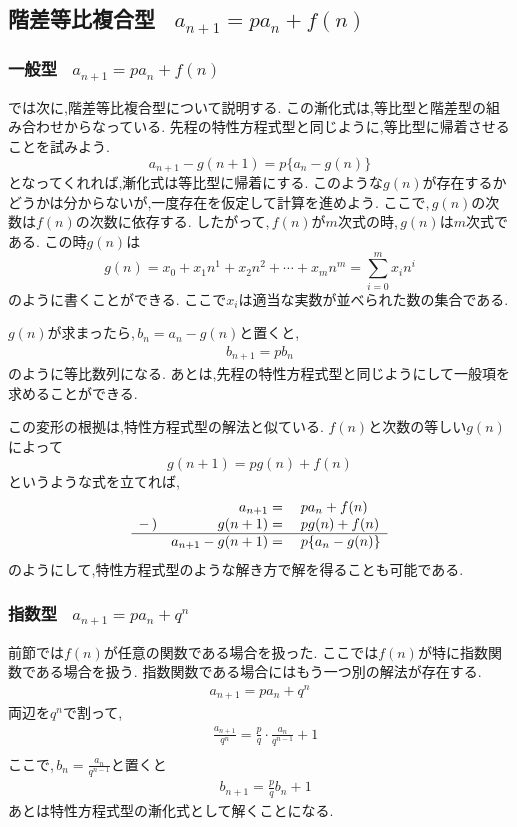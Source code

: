 
  \subsection{階差等比複合型 \, $\displaystyle a_{n+1}=pa_n+f(n)$}
    \subsubsection{一般型 \, $\displaystyle a_{n+1}=pa_n+f(n)$}
      では次に,階差等比複合型について説明する.
      この漸化式は,等比型と階差型の組み合わせからなっている.
      先程の特性方程式型と同じように,等比型に帰着させることを試みよう.
      \[
        a_{n+1}-g(n+1)=p\{a_n-g(n)\}
      \]
      となってくれれば,漸化式は等比型に帰着にする.
      このような$g(n)$が存在するかどうかは分からないが,一度存在を仮定して計算を進めよう.
      ここで,\,$g(n)$の次数は$f(n)$の次数に依存する.
      したがって,\,$f(n)$が$m$次式の時,\,$g(n)$は$m$次式である.
      この時$g(n)$は
      \[
        g(n) = x_0 + x_1 n^1 + x_2 n^2  + \cdots +x_{m} n^m =\sum_{i=0}^{m} x_i n^{i}
      \]
      のように書くことができる.
      ここで$x_i$は適当な実数が並べられた数の集合である.

      $g(n)$が求まったら,\,$b_n=a_n-g(n)$と置くと,
      \begin{align*}
        b_{n+1}=pb_n
      \end{align*}
      のように等比数列になる.
      あとは,先程の特性方程式型と同じようにして一般項を求めることができる.

      この変形の根拠は,特性方程式型の解法と似ている.
      $f(n)$と次数の等しい$g(n)$によって
      \[
        g(n+1)=pg(n)+f(n)
      \]
      というような式を立てれば,
      \[
        \begin{array}{rrl}
          & a_{n+1}={} & pa_n+f(n)\\
          -\,) & g(n+1)={} & pg(n)+f(n)\\ \hline
          & a_{n+1}-g(n+1)={} & p\{a_n-g(n)\}
        \end{array}
      \]
      のようにして,特性方程式型のような解き方で解を得ることも可能である.
    \subsubsection{指数型  \, $\displaystyle a_{n+1}=pa_n+q^n$}
      前節では$f(n)$が任意の関数である場合を扱った.
      ここでは$f(n)$が特に指数関数である場合を扱う.
      指数関数である場合にはもう一つ別の解法が存在する.
      \begin{align*}
        a_{n+1}=pa_n+q^n
      \end{align*}
      両辺を$q^n$で割って,
      \begin{align*}      
        &\frac{a_{n+1}}{q^n}=\frac{p}{q}\cdot\frac{a_n}{q^{n-1}}+1\\
      \end{align*}
      ここで,\,$b_n=\frac{a_n}{q^{n-1}}$と置くと
      \begin{align*}
        &b_{n+1}=\frac{p}{q}b_n+1
      \end{align*}
      あとは特性方程式型の漸化式として解くことになる.
